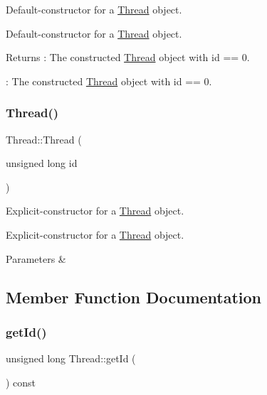 Default-\/constructor for a \hyperlink{class_thread}{Thread} object. 

Default-\/constructor for a \hyperlink{class_thread}{Thread} object. \begin{DoxyReturn}{Returns}
\+: The constructed \hyperlink{class_thread}{Thread} object with id == 0.

\+: The constructed \hyperlink{class_thread}{Thread} object with id == 0. 
\end{DoxyReturn}
\mbox{\label{class_thread_a4b0b62961ddc8eedec7be379118d0588}} 
\subsubsection{\texorpdfstring{Thread()}{Thread()}\hspace{0.1cm}{\footnotesize\ttfamily [2/2]}}
{\footnotesize\ttfamily Thread\+::\+Thread (\begin{DoxyParamCaption}\item[{unsigned long}]{id }\end{DoxyParamCaption})}



Explicit-\/constructor for a \hyperlink{class_thread}{Thread} object. 

Explicit-\/constructor for a \hyperlink{class_thread}{Thread} object. 
\begin{DoxyParams}{Parameters}
{\em } & \\
\hline
\end{DoxyParams}


\subsection{Member Function Documentation}
\mbox{\label{class_thread_aca302203fb0d46f6ea42bb49f689f6a6}} 
\subsubsection{\texorpdfstring{get\+Id()}{getId()}}
{\footnotesize\ttfamily unsigned long Thread\+::get\+Id (\begin{DoxyParamCaption}{ }\end{DoxyParamCaption}) const}



